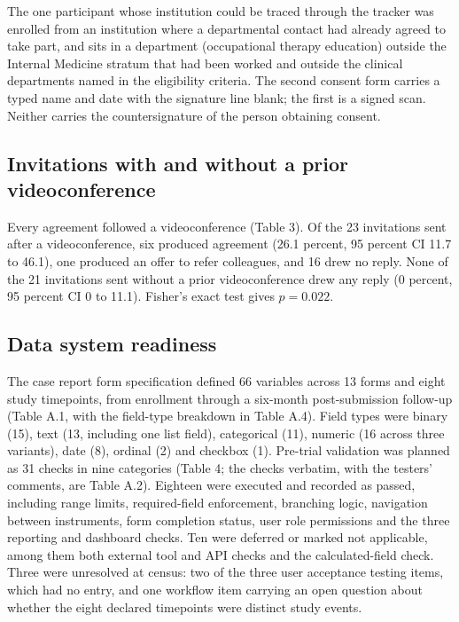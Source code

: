 \documentclass[11pt,a4paper]{article}
\begin{document}
The one participant whose institution could be traced through the tracker was enrolled from an institution where a departmental contact had already agreed to take part, and sits in a department (occupational therapy education) outside the Internal Medicine stratum that had been worked and outside the clinical departments named in the eligibility criteria. The second consent form carries a typed name and date with the signature line blank; the first is a signed scan. Neither carries the countersignature of the person obtaining consent.

\subsection{Invitations with and without a prior videoconference}

Every agreement followed a videoconference (Table 3). Of the 23 invitations sent after a videoconference, six produced agreement (26.1 percent, 95 percent CI 11.7 to 46.1), one produced an offer to refer colleagues, and 16 drew no reply. None of the 21 invitations sent without a prior videoconference drew any reply (0 percent, 95 percent CI 0 to 11.1). Fisher's exact test gives $p = 0.022$.

\subsection{Data system readiness}

The case report form specification defined 66 variables across 13 forms and eight study timepoints, from enrollment through a six-month post-submission follow-up (Table A.1, with the field-type breakdown in Table A.4). Field types were binary (15), text (13, including one list field), categorical (11), numeric (16 across three variants), date (8), ordinal (2) and checkbox (1). Pre-trial validation was planned as 31 checks in nine categories (Table 4; the checks verbatim, with the testers' comments, are Table A.2). Eighteen were executed and recorded as passed, including range limits, required-field enforcement, branching logic, navigation between instruments, form completion status, user role permissions and the three reporting and dashboard checks. Ten were deferred or marked not applicable, among them both external tool and API checks and the calculated-field check. Three were unresolved at census: two of the three user acceptance testing items, which had no entry, and one workflow item carrying an open question about whether the eight declared timepoints were distinct study events.
\end{document}
